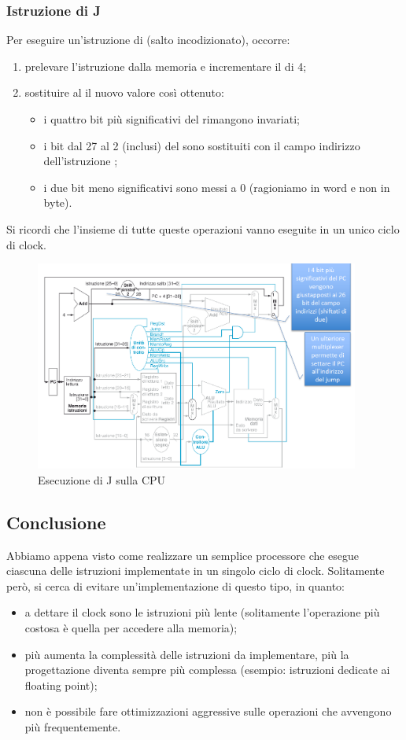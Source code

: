 \documentclass[class=book, crop=false, oneside]{standalone}
\begin{document}
\subsubsection{Istruzione di J}
Per eseguire un'istruzione di  (salto incodizionato), occorre:
\begin{enumerate}
	\item prelevare l’istruzione dalla memoria e incrementare il  di 4;
	\item sostituire al  il nuovo valore così ottenuto:
	\begin{itemize}
		\item i quattro bit più significativi del  rimangono invariati;
		\item i bit dal 27 al 2 (inclusi) del  sono sostituiti con il campo indirizzo dell'istruzione ;
		\item i due bit meno significativi sono messi a 0 (ragioniamo in word e non in byte).
	\end{itemize}
\end{enumerate}
Si ricordi che l'insieme di tutte queste operazioni vanno eseguite in un unico ciclo di clock.

\begin{figure}[H]
	\centering
	\includegraphics[width=0.95\textwidth,keepaspectratio]{es_j.png}
	\caption{Esecuzione di J sulla CPU}
\end{figure}

\subsection*{Conclusione}
Abbiamo appena visto come realizzare un semplice processore che esegue ciascuna delle istruzioni implementate in un singolo ciclo di clock. Solitamente però, si cerca di evitare un'implementazione di questo tipo, in quanto:
\begin{itemize}
	\item a dettare il clock sono le istruzioni più lente (solitamente l'operazione più costosa è quella per accedere alla memoria);
	\item più aumenta la complessità delle istruzioni da implementare, più la progettazione diventa sempre più complessa (esempio: istruzioni dedicate ai floating point);
	\item non è possibile fare ottimizzazioni aggressive sulle operazioni che avvengono più frequentemente.
\end{itemize}
\end{document}
